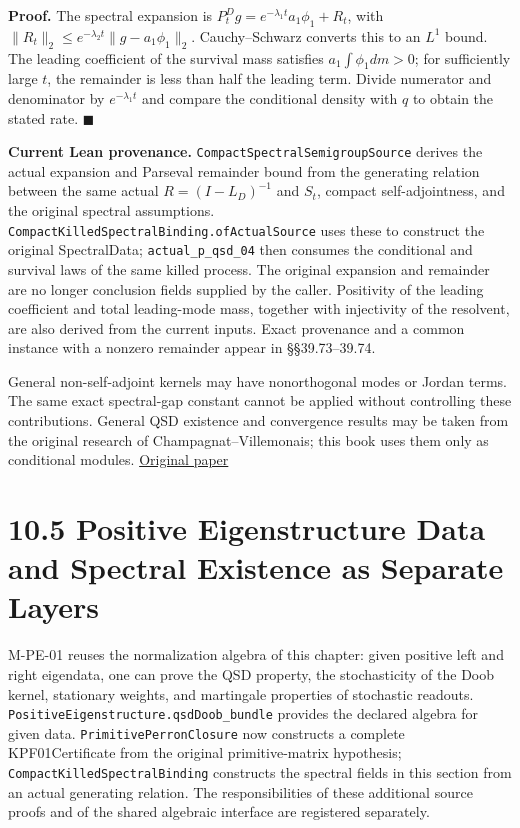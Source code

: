 \documentclass[
  english,
  11pt,
  oneside]{book}
\begin{document}
\textbf{Proof.} The spectral expansion is \(P_t^Dg=e^{-\lambda_1t}a_1\phi_1+R_t\), with \(\|R_t\|_2\le e^{-\lambda_2t}\|g-a_1\phi_1\|_2\). Cauchy--Schwarz converts this to an \(L^1\) bound. The leading coefficient of the survival mass satisfies \(a_1\int\phi_1dm>0\); for sufficiently large \(t\), the remainder is less than half the leading term. Divide numerator and denominator by \(e^{-\lambda_1t}\) and compare the conditional density with \(q\) to obtain the stated rate. \(\blacksquare\)

\textbf{Current Lean provenance.} \nolinkurl{CompactSpectralSemigroupSource} derives the actual expansion and Parseval remainder bound from the generating relation between the same actual \(R=(I-L_D)^{-1}\) and \(S_t\), compact self-adjointness, and the original spectral assumptions. \nolinkurl{CompactKilledSpectralBinding.ofActualSource} uses these to construct the original SpectralData; \nolinkurl{actual_p_qsd_04} then consumes the conditional and survival laws of the same killed process. The original expansion and remainder are no longer conclusion fields supplied by the caller. Positivity of the leading coefficient and total leading-mode mass, together with injectivity of the resolvent, are also derived from the current inputs. Exact provenance and a common instance with a nonzero remainder appear in §§39.73--39.74.

General non-self-adjoint kernels may have nonorthogonal modes or Jordan terms. The same exact spectral-gap constant cannot be applied without controlling these contributions. General QSD existence and convergence results may be taken from the original research of Champagnat--Villemonais; this book uses them only as conditional modules. \href{https://arxiv.org/abs/1404.1349}{Original paper}

\section{10.5 Positive Eigenstructure Data and Spectral Existence as Separate Layers}\label{positive-eigenstructure-data-and-spectral-existence-as-separate-layers}

M-PE-01 reuses the normalization algebra of this chapter: given positive left and right eigendata, one can prove the QSD property, the stochasticity of the Doob kernel, stationary weights, and martingale properties of stochastic readouts. \nolinkurl{PositiveEigenstructure.qsdDoob_bundle} provides the declared algebra for given data. \nolinkurl{PrimitivePerronClosure} now constructs a complete KPF01Certificate from the original primitive-matrix hypothesis; \nolinkurl{CompactKilledSpectralBinding} constructs the spectral fields in this section from an actual generating relation. The responsibilities of these additional source proofs and of the shared algebraic interface are registered separately.
\end{document}
